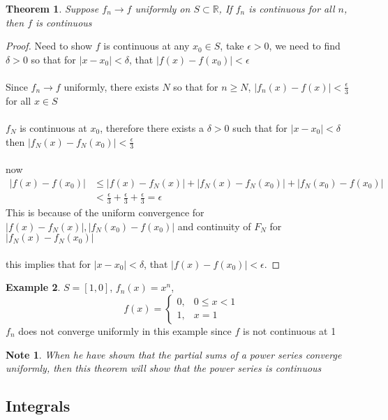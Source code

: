 \documentclass[12pt]{article}
\theoremstyle{plain}
\newtheorem*{note}{Note}
\newtheorem{theorem}{Theorem}[section]
\theoremstyle{definition}
\newtheorem{example}[theorem]{Example}
\begin{document}
\begin{theorem}
	Suppose $f_n \to f$ uniformly on $S \subset \mathbb{R}$, If $f_n$ is continuous for all $n$, then $f$ is continuous
\end{theorem}

\begin{proof}
	Need to show $f$ is continuous at any $x_0 \in S$, take $\epsilon > 0$, we need to find $\delta > 0$ so that for $|x - x_0| < \delta$, that $|f(x) - f(x_0)| < \epsilon$\\
	\\
	Since $f_n \to f$ uniformly, there exists $N$ so that for $n \geq N$, $|f_n (x) - f(x)| < \frac{\epsilon}{3}$ for all $x\in S$\\
	\\
	$f_N$ is continuous at $x_0$, therefore there exists a $\delta > 0$ such that for $|x-x_0| < \delta$ then $|f_N (x) - f_N (x_0)| < \frac{\epsilon}{3}$\\
	\\
	now
	\begin{align*}
		|f(x) - f(x_0)| & \leq |f(x) - f_N (x)| + |f_N (x) - f_N (x_0)| + |f_N (x_0) - f(x_0)|\\
		&< \frac{\epsilon}{3} + \frac{\epsilon}{3} + \frac{\epsilon}{3} = \epsilon
	\end{align*}
	This is because of the uniform convergence for $|f(x) - f_N (x)|, |f_N (x_0) - f(x_0)|$ and continuity of $F_N$ for $|f_N (x) - f_N (x_0)|$\\
	\\
	this implies that for $|x - x_0| < \delta$, that $|f(x) - f(x_0)| < \epsilon$.
\end{proof}

\begin{example}
	$S = [1,0]$, $f_n (x) = x^n$,
	$$f(x) = \begin{cases}
		0, &0 \leq x < 1\\
		1, &x = 1
	\end{cases}
$$
$f_n$ does not converge uniformly in this example since $f$ is not continuous at 1
\end{example}

\begin{note}
	When he have shown that the partial sums of a power series converge uniformly, then this theorem will show that the power series is continuous
\end{note}

\subsection{Integrals}
\end{document}
